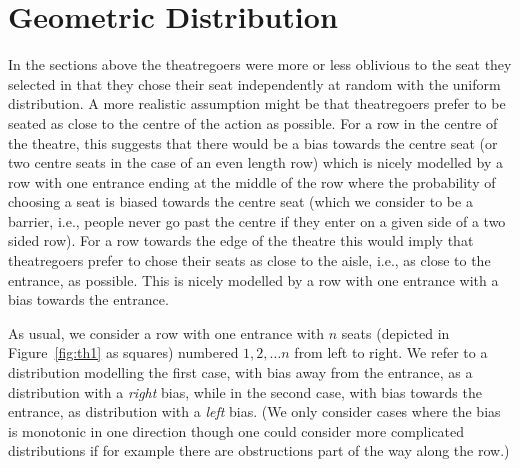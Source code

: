 \documentclass[11pt]{llncs}
\begin{document}
\begin{comment}
As an immediate corollary,
using the expansion of $\ln (1-p)$ in a Taylor series (in the variable $p$)
we derive the following result.

\begin{corollary}
For firxed $0 <p<1$,
the
expected number $F_n$ of occupied seats in an arrangement of $n$ seats
in a row having two entrances 
with probabilistically $p$-courteous
theatregoers is given by the expression
\begin{equation}
\label{pach2a}
-\frac{1}{1-p} + 2\frac{H_n - \ln (1-p)}{1-p},
\end{equation}
asymptotically in $n$.
\qed
\end{corollary}
\end{comment}






\section{Geometric Distribution}
\label{geo:sec}

In the sections above the theatregoers were more or less oblivious
to the seat they selected in that they chose their
seat independently at random with the uniform distribution. A
more realistic assumption might be that theatregoers prefer to be
seated as close to the centre of the action as possible. For a row
in the centre of the theatre, this suggests that there would be
a bias towards the centre seat (or two centre seats in the case of an even
length row) which is nicely modelled by a row with one entrance ending
at the middle of the row
where the probability of choosing a seat is biased towards the centre seat (which
we consider to be a barrier, i.e., people never go past the centre if they enter
on a given side of a two sided row).  
For a row towards the edge of the theatre this would imply that
theatregoers prefer to chose their seats as close to the aisle, i.e.,
as close to the entrance, as possible. This is nicely modelled by
a row with one entrance with a bias towards the entrance. 

As usual, we consider a row with one entrance with $n$ seats
(depicted in Figure~\ref{fig:th1} as squares) 
numbered $1, 2, \ldots n$ from left to right.
We
refer to a distribution modelling the first case, with bias away from the entrance, as a
distribution with a {\em right} bias, while in the second case, with bias towards
the entrance, as distribution with a {\em left} bias. (We only consider cases where
the bias is monotonic in one direction though one could consider more 
complicated distributions if for example there are obstructions part of the way 
along the row.)
\end{document}
